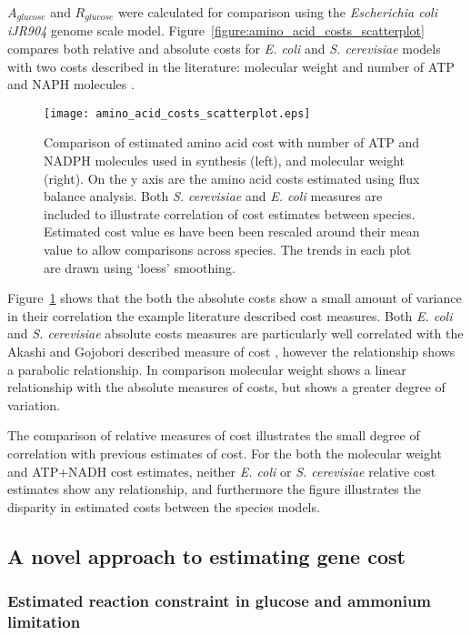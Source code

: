 $A_{glucose}$ and $R_{glucose}$ were calculated for comparison using the \emph{Escherichia coli iJR904} genome scale model. Figure~\vref{figure:amino_acid_costs_scatterplot} compares both relative and absolute costs for \emph{E. coli} and \emph{S. cerevisiae} models with two costs described in the literature: molecular weight \cite{seligmann2003} and number of ATP and NAPH molecules \cite{akashi2002}.

\begin{figure}
\centering
\texttt{[image: amino\_acid\_costs\_scatterplot.eps]}
\caption[Comparison of the genome scale model derived cost data sets.]{Comparison of estimated amino acid cost with number of ATP and NADPH molecules used in synthesis (left), and molecular weight (right). On the y axis are the amino acid costs estimated using flux balance analysis. Both \emph{S. cerevisiae} and \emph{E. coli} measures are included to illustrate correlation of cost estimates between species. Estimated cost value
es have been been rescaled around their mean value to allow comparisons across species. The trends in each plot are drawn using `loess' smoothing.}
\label{figure:amino_acid_costs_scatterplot}
\end{figure}

Figure~\ref{figure:amino_acid_costs_scatterplot} shows that the both the absolute costs show a small amount of variance in their correlation the example literature described cost measures. Both \emph{E. coli} and \emph{S. cerevisiae} absolute costs measures are particularly well correlated with the Akashi and Gojobori described measure of cost \cite{akashi2002}, however the relationship shows a parabolic relationship. In comparison molecular weight shows a linear relationship with the absolute measures of costs, but shows a greater degree of variation.

The comparison of relative measures of cost illustrates the small degree of correlation with previous estimates of cost. For the both the molecular weight and ATP+NADH cost estimates, neither \emph{E. coli} or \emph{S. cerevisiae} relative cost estimates show any relationship, and furthermore the figure illustrates the disparity in estimated costs between the species models.

\subsection{A novel approach to estimating gene cost}

\subsubsection{Estimated reaction constraint in glucose and ammonium limitation}


